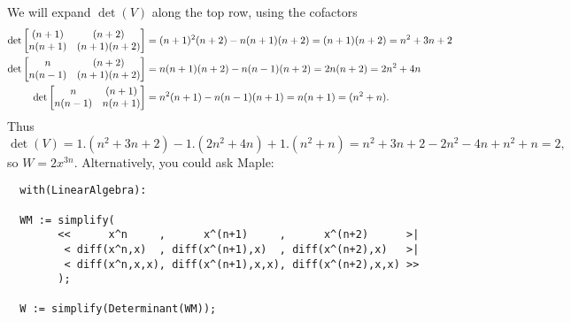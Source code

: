 We will expand $\det(V)$ along the top row, using the cofactors
 {\tiny \begin{align*}
  \det\left[\begin{matrix} (n+1) & (n+2)  \\ n(n+1) & (n+1)(n+2) \end{matrix}\right]
   &= (n+1)^2(n+2) - n(n+1)(n+2) = (n+1)(n+2) = n^2+3n+2 \\
  \det\left[\begin{matrix} n  & (n+2)  \\ n(n-1) & (n+1)(n+2) \end{matrix}\right]
   &= n(n+1)(n+2) - n(n-1)(n+2)
    = 2n(n+2) = 2n^2+4n \\
  \det\left[\begin{matrix} n & (n+1) \\ n(n-1) & n(n+1) \end{matrix}\right]
   &= n^2(n+1) - n(n-1)(n+1)
    = n(n+1) = (n^2+n).
 \end{align*}}
 Thus
 \[ \det(V) =
   1 . (n^2+3n+2) - 1.(2n^2+4n) + 1.(n^2+n) =
   n^2+3n+2-2n^2-4n+n^2+n = 2,
 \]
 so $W=2x^{3n}$.  Alternatively, you could ask Maple:
\begin{verbatim}
  with(LinearAlgebra):

  WM := simplify(
        <<      x^n     ,      x^(n+1)     ,      x^(n+2)      >|
         < diff(x^n,x)  , diff(x^(n+1),x)  , diff(x^(n+2),x)   >|
         < diff(x^n,x,x), diff(x^(n+1),x,x), diff(x^(n+2),x,x) >>
        );

  W := simplify(Determinant(WM));
\end{verbatim}
\EndDeferredSolution

